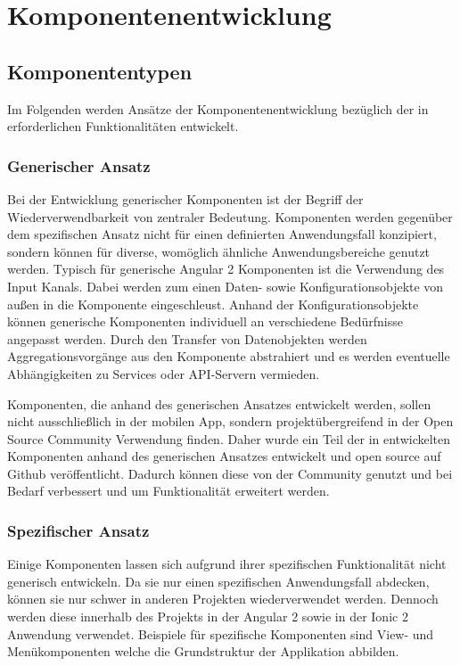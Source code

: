 \section{Komponentenentwicklung}

\subsection{Komponententypen}

Im Folgenden werden Ansätze der Komponentenentwicklung bezüglich der in
\projectname{} erforderlichen Funktionalitäten entwickelt.


\subsubsection{Generischer Ansatz}

Bei der Entwicklung generischer Komponenten ist der Begriff der Wiederverwendbarkeit von zentraler Bedeutung.
Komponenten werden gegenüber dem spezifischen Ansatz nicht für einen definierten Anwendungsfall konzipiert,
sondern können
für diverse, womöglich ähnliche Anwendungsbereiche genutzt werden.
Typisch für generische Angular 2 Komponenten ist die Verwendung des Input Kanals.
Dabei werden zum einen Daten- sowie Konfigurationsobjekte von außen in die Komponente eingeschleust.
Anhand der Konfigurationsobjekte können generische Komponenten individuell an verschiedene Bedürfnisse angepasst werden.
Durch den Transfer von Datenobjekten werden Aggregationsvorgänge aus den Komponente abstrahiert und es werden eventuelle
Abhängigkeiten zu Services oder API-Servern vermieden.

Komponenten,
die anhand des generischen Ansatzes entwickelt werden,
sollen nicht ausschließlich in der mobilen App,
sondern projektübergreifend in der Open Source Community Verwendung finden.
Daher wurde ein Teil der in \projectname{} entwickelten Komponenten anhand des generischen Ansatzes
entwickelt und open source auf Github veröffentlicht.
Dadurch können diese von der Community genutzt und bei Bedarf verbessert und um Funktionalität erweitert werden.


\subsubsection{Spezifischer Ansatz}

Einige Komponenten lassen sich aufgrund ihrer spezifischen Funktionalität nicht generisch entwickeln.
Da sie nur einen spezifischen Anwendungsfall abdecken, können sie nur schwer in anderen Projekten wiederverwendet werden.
Dennoch werden diese innerhalb des Projekts \projectname{}
in der Angular 2 sowie in der Ionic 2 Anwendung verwendet.
Beispiele für spezifische Komponenten sind View- und Menükomponenten welche die Grundstruktur der Applikation abbilden.

